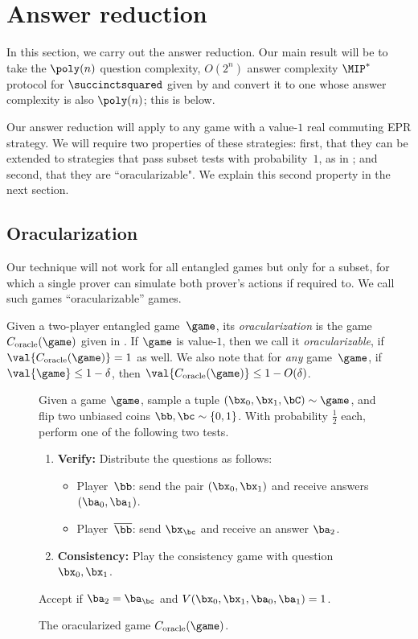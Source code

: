 \section{Answer reduction}\label{sec:answer-reduction}

In this section, we carry out the answer reduction.
Our main result will be to take the $\poly(n)$ question complexity, $O(2^n)$ answer complexity $\MIP^*$ protocol for $\succinctsquared$
given by 
and convert it to one whose answer complexity is also $\poly(n)$;
this is  below.

Our answer reduction will apply to any game with a value-$1$ real commuting EPR strategy.
We will require two properties of these strategies:
first, that they can be extended to strategies that pass subset tests with probability~$1$, as in ;
and second, that they are ``oracularizable".
We explain this second property in the next section. 

\subsection{Oracularization}

Our technique will not work for all entangled games but only for a
subset, for which a single prover can simulate both prover's actions
if required to. We call such games ``oracularizable'' games.


\begin{definition}
Given a two-player entangled game~$\game$,
its \emph{oracularization} is the game $C_{\mathrm{oracle}}(\game)$ given in .
If $\game$ is value-$1$,
then we call it \emph{oracularizable}, if $\val{C_{\mathrm{oracle}}(\game)} = 1$ as well. 
We also note that for \emph{any} game~$\game$, if $\val{\game} \leq 1 -
  \delta$, then $\val{C_{\mathrm{oracle}}(\game)} \leq 1 - O(\delta)$.
\end{definition}

{
  \begin{figure}
    Given a game $\game$, sample a tuple $(\bx_0, \bx_1, \bC) \sim
    \game$, and flip two unbiased coins $\bb, \bc \sim \{0,1\}$.
    With probability $\tfrac{1}{2}$ each, perform one of the following two tests. 
    \begin{enumerate}
      \item \textbf{Verify:} Distribute the questions as follows:
      	\begin{itemize}
	\item[$\circ$] Player~$\bb$: send the pair $(\bx_0, \bx_1)$ and receive answers $(\ba_0, \ba_1)$.
	\item[$\circ$] Player~$\overline{\bb}$: send $\bx_{\bc}$ and receive an answer $\ba_2$.
	\end{itemize}
	\item \textbf{Consistency:} Play the consistency game with question $\bx_0, \bx_1$.
    \end{enumerate}
    Accept if $\ba_2 = \ba_{\bc}$ and $V(\bx_0, \bx_1, \ba_0, \ba_1) = 1$.
    \caption{The oracularized game $C_{\mathrm{oracle}}(\game)$.\label{fig:oracle}}
  \end{figure}
  }
  
